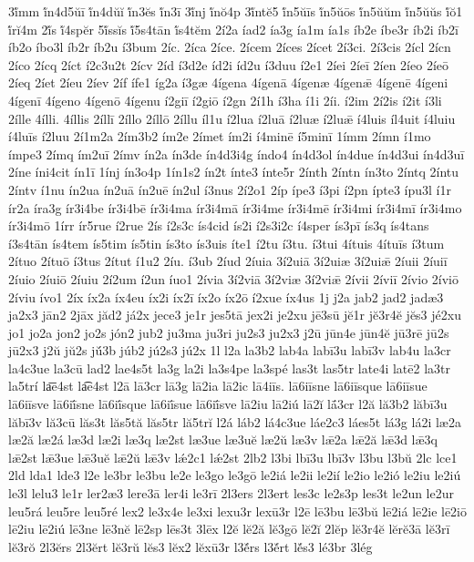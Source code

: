 {3ĭ́mm
ĭ́n4d5ŭī
ĭ́n4dŭĭ
ĭ́n3ĕs
ĭ́n3ī
3ĭ́nj
ĭ́nŏ4p
3ĭ́ntĕ5
ĭ́n5ŭīs
ĭ́n5ŭōs
ĭ́n5ŭŭm
ĭ́n5ŭŭs
ĭ́ŏ1
ĭ́rĭ4m
2ĭ́s
ĭ́4spĕr
5ĭ́ssĭs
ĭ́5s4tān
ĭ́s4tĕm
2í2a
íad2
ía3g
ía1m
ía1s
íb2e
íbe3r
íb2i
íb2ī
íb2o
íbo3l
íb2r
íb2u
í3bum
2íc.
2íca
2íce.
2ícem
2íces
2ícet
2í3ci.
2í3cis
2ícl
2ícn
2íco
2ícq
2íct
í2c3u2t
2ícv
2íd
í3d2e
íd2i
íd2u
í3duu
í2e1
2íei
2íeī
2íen
2íeo
2íeō
2íeq
2íet
2íeu
2íev
2íf
ífe1
íg2a
í3gæ
4ígena
4ígenā
4ígenæ
4ígenǣ
4ígenē
4ígeni
4ígenī
4ígeno
4ígenō
4ígenu
í2giī
í2giō
í2gn
2í1h
í3ha
í1i
2íi.
í2im
2í2is
í2it
í3li
2ílle
4ílli.
4íllis
2íllī
2íllo
2íllō
2íllu
íl1u
í2lua
í2luā
í2luæ
í2luǣ
í4luis
íl4uit
í4luiu
í4luīs
í2luu
2í1m2a
2ím3b2
ím2e
2ímet
ím2i
í4minē
í5minī
1ímm
2ímn
í1mo
ímpe3
2ímq
ím2uī
2ímv
ín2a
ín3de
ín4d3i4g
índo4
ín4d3ol
ín4due
ín4d3ui
ín4d3uī
2íne
íni4cit
ín1ī
1ínj
ín3o4p
1ín1s2
ín2t
ínte3
ínte5r
2ínth
2íntn
ín3to
2íntq
2íntu
2íntv
í1nu
ín2ua
ín2uā
ín2uē
ín2ul
í3nus
2í2o1
2íp
ípe3
í3pi
í2pn
ípte3
ípu3l
í1r
ír2a
íra3g
ír3i4be
ír3i4bē
ír3i4ma
ír3i4mā
ír3i4me
ír3i4mē
ír3i4mi
ír3i4mī
ír3i4mo
ír3i4mō
1írr
ír5rue
í2rue
2ís
í2s3c
ís4cid
ís2i
í2s3i2c
í4sper
ís3pī
ís3q
ís4tans
í3s4tān
ís4tem
ís5tim
ís5tin
ís3to
ís3uis
íte1
í2tu
í3tu.
í3tui
4ítuis
4ítuīs
í3tum
2ítuo
2ítuō
í3tus
2ítut
í1u2
2íu.
í3ub
2íud
2íuia
3í2uiā
3í2uiæ
3í2uiǣ
2íuii
2íuiī
2íuio
2íuiō
2íuiu
2í2um
í2un
íuo1
2ívia
3í2viā
3í2viæ
3í2viǣ
2ívii
2íviī
2ívio
2íviō
2íviu
ívo1
2íx
íx2a
íx4eu
íx2i
íx2ī
íx2o
íx2ō
í2xue
íx4us
1j
j2a
jab2
jad2
jadæ3
ja2x3
jān2
2jāx
jăd2
já2x
jece3
je1r
jes5tā
jex2i
je2xu
jē3sū
jĕ1r
jĕ3r4ĕ
jĕs3
jé2xu
jo1
jo2a
jon2
jo2s
jón2
jub2
ju3ma
ju3ri
ju2s3
ju2x3
j2ū
jūn4e
jūn4ĕ
jū3rē
jū2s
jū2x3
j2ŭ
jŭ2s
jŭ́3b
júb2
jú2s3
jú2x
1l
l2a
la3b2
lab4a
labī3u
labī3v
lab4u
la3cr
la4c3ue
la3cū
lad2
lae4s5t
la3g
la2i
la3s4pe
la3spé
las3t
las5tr
late4i
latē2
la3tr
la5trí
la͞e4st
la͡e4st
l2ā
lā3cr
lā3g
lā2ia
lā2ic
lā4iīs.
lā6iīsne
lā6iīsque
lā6iīsue
lā6iīsve
lā6iī́sne
lā6iī́sque
lā6iī́sue
lā6iī́sve
lā2iu
lā2iú
lā2ĭ
lā́3cr
l2ă
lă3b2
lăbī3u
lăbī3v
lă3cū
lăs3t
lăs5tă
lăs5tr
lă5trĭ
l2á
láb2
lá4c3ue
láe2c3
láes5t
lá3g
lá2i
læ2a
læ2ă
læ2á
læ3d
læ2i
læ3q
læ2st
læ3ue
læ3uĕ
læ2ŭ
læ3v
lǣ2a
lǣ2ă
lǣ3d
lǣ3q
lǣ2st
lǣ3ue
lǣ3uĕ
lǣ2ŭ
lǣ3v
lǽ2c1
lǽ2st
2lb2
l3bi
lbī3u
lbī3v
l3bu
l3bŭ
2lc
lce1
2ld
lda1
lde3
l2e
le3br
le3bu
le2e
le3go
le3gō
le2iá
le2ii
le2ií
le2io
le2ió
le2iu
le2iú
le3l
lelu3
le1r
ler2æ3
lere3ā
ler4i
le3rī
2l3ers
2l3ert
les3c
le2s3p
les3t
le2un
le2ur
leu5rá
leu5re
leu5ré
lex2
le3x4e
le3xi
lexu3r
lexū3r
l2ē
lē3bu
lē3bŭ
lē2iá
lē2ie
lē2iō
lē2iu
lē2iú
lē3ne
lē3nĕ
lē2sp
lēs3t
3lēx
l2ĕ
lĕ2ă
lĕ3gō
lĕ2ĭ
2lĕp
lĕ3r4ĕ
lĕrĕ3ā
lĕ3rī
lĕ3rŏ
2l3ĕrs
2l3ĕrt
lĕ3rŭ
lĕs3
lĕx2
lĕxū3r
l3ĕ́rs
l3ĕ́rt
lĕ́s3
lé3br
3lég
}
